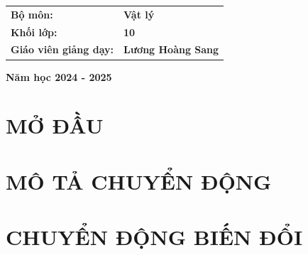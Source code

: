\documentclass[twoside,12pt]{report}
\begin{document}
\begin{titlepage}
		\vspace{1cm}
		\begin{center}
			\fontsize{13pt}{17pt}\selectfont 
			\begin{tabular}{L{5cm}L{4.5cm}}
				\textbf{Bộ môn:}&\textbf{Vật lý}\\
				\textbf{Khối lớp:}&\textbf{10}\\
				\textbf{Giáo viên giảng dạy:}& \textbf{Lương Hoàng Sang}\\
			\end{tabular}
		\end{center}
		
		\vspace{4cm}
		
		\begin{center}
			\fontsize{13pt}{17pt}\selectfont 
			\textbf{Năm học 2024 - 2025}
		\end{center}
	\end{titlepage}
	\newpage
\tableofcontents
\cleardoublepage

%
\setcounter{part}{0}
\pagestyle{fancy}
\part{MỞ ĐẦU}

\newpage
\newpage
\part{MÔ TẢ CHUYỂN ĐỘNG}
\newpage
\newpage
\newpage
\part{CHUYỂN ĐỘNG BIẾN ĐỔI}
\newpage
\newpage
\end{document}
